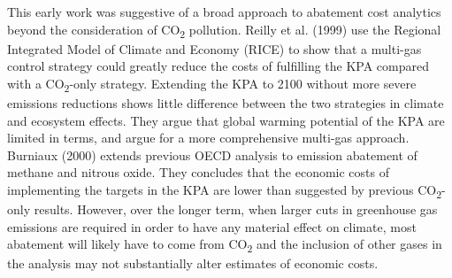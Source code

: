 \documentclass[
  10pt,
]{article}
\begin{document}
This early work was suggestive of a broad approach to abatement cost
analytics beyond the consideration of CO\textsubscript{2} pollution.
Reilly et al. (1999) use the Regional Integrated Model of Climate and
Economy (RICE) to show that a multi-gas control strategy could greatly
reduce the costs of fulfilling the KPA compared with a
CO\textsubscript{2}-only strategy. Extending the KPA to 2100 without
more severe emissions reductions shows little difference between the two
strategies in climate and ecosystem effects. They argue that global
warming potential of the KPA are limited in terms, and argue for a more
comprehensive multi-gas approach. Burniaux (2000) extends previous OECD
analysis to emission abatement of methane and nitrous oxide. They
concludes that the economic costs of implementing the targets in the KPA
are lower than suggested by previous CO\textsubscript{2}-only results.
However, over the longer term, when larger cuts in greenhouse gas
emissions are required in order to have any material effect on climate,
most abatement will likely have to come from CO\textsubscript{2} and the
inclusion of other gases in the analysis may not substantially alter
estimates of economic costs.
\end{document}
